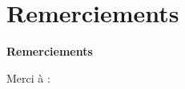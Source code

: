 \chapter*{Remerciements}

\vfill

\begin{center}%
    \bfseries Remerciements
\end{center}

Merci à  : \myThanks

\vfill
